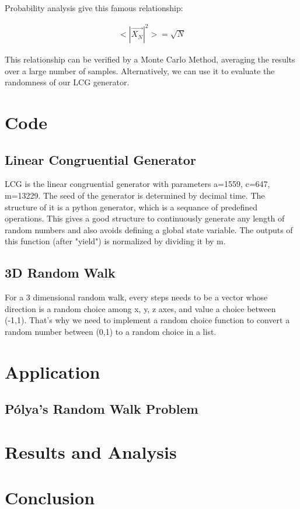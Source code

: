 \documentclass{article}
\begin{document}
Probability analysis give this famous relationship:

\begin{align*}
  <|\vec{X_N}|^2> = \sqrt{N} 
\end{align*}

This relationship can be verified by a Monte Carlo Method, averaging the results
over a large number of samples. Alternatively, we can use it to evaluate the 
randomness of our LCG generator.
\section{Code}

\subsection{Linear Congruential Generator}



LCG is the linear congruential generator with parameters a=1559, c=647,
m=13229. The seed of the generator is determined by decimal time. The structure of it
is a python generator, which is a sequance of predefined operations. This gives a good 
structure to continuously generate any length of random numbers and also avoids defining
a global state variable. The outputs of this function (after "yield") is normalized by
dividing it by m. \\

\subsection{3D Random Walk}



For a 3 dimensional random walk, every steps needs to be a vector whose direction is
a random choice among x, y, z axes, and value a choice between (-1,1). That's why we 
need to implement a random choice function to convert a random number between (0,1) to 
a random choice in a list.





\section{Application}

\subsection{P\'olya's Random Walk Problem}

\section{Results and Analysis}

\section{Conclusion}
\end{document}
